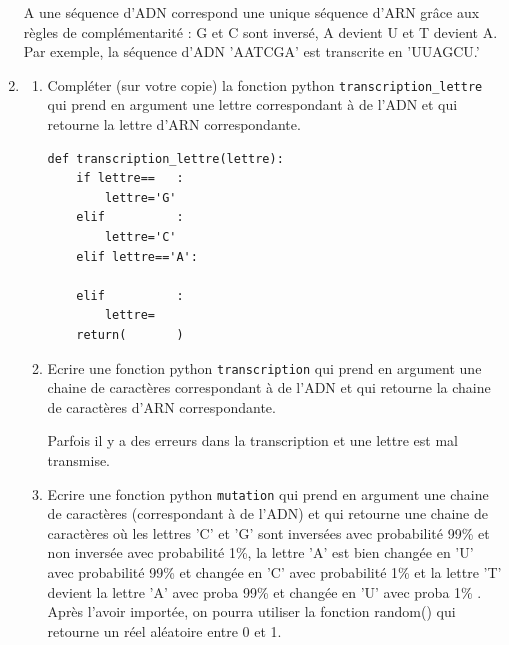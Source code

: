 \begin{exercice}[Informatique]
\begin{enumerate}
A une séquence d’ADN  correspond une unique séquence d’ARN grâce aux règles de complémentarité : G  et   C sont inversé, A devient U et T devient A. Par exemple, la séquence d’ADN 'AATCGA' est transcrite en 'UUAGCU.' 
\item 
\begin{enumerate}

\item Compléter (sur votre copie)  la fonction python  \texttt{transcription\_lettre} qui prend en argument une lettre correspondant à de l'ADN et qui retourne la lettre d'ARN correspondante. 
\begin{lstlisting}
def transcription_lettre(lettre):
	if lettre==   :
		lettre='G'
	elif          :
		lettre='C'
	elif lettre=='A':
	
	elif          :
		lettre=
    return(       )
\end{lstlisting}

\item Ecrire une fonction python \texttt{transcription} qui prend en argument une chaine de caractères correspondant à de l'ADN et qui retourne la chaine de caractères d'ARN correspondante. 


Parfois il y  a  des erreurs dans la transcription et une lettre est mal transmise. 

\item Ecrire une fonction python \texttt{mutation} qui prend en argument une chaine de caractères (correspondant à de l'ADN) et qui retourne une  chaine de caractères où les lettres 'C' et 'G' sont inversées avec probabilité  99\% et non inversée avec probabilité 1\%, la lettre 'A' est bien changée en 'U' avec probabilité 99\% et changée en 'C' avec probabilité 1\% et la lettre 'T' devient la  lettre 'A' avec proba 99\% et changée en 'U' avec proba 1\%  . Après l'avoir importée, on pourra utiliser la fonction random() qui retourne un réel aléatoire entre 0 et 1. 

\end{enumerate}

\end{enumerate}


\end{exercice}



